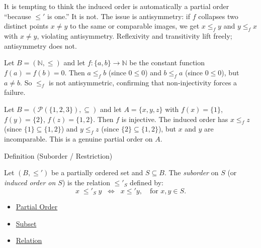 \begin{remark*}
It is tempting to think the induced order is automatically a partial order
``because $\leq'$ is one.'' It is not. The issue is antisymmetry: if $f$
collapses two distinct points $x \neq y$ to the same or comparable images,
we get $x \leq_f y$ and $y \leq_f x$ with $x \neq y$, violating
antisymmetry. Reflexivity and transitivity lift freely; antisymmetry does
not.
\end{remark*}

\begin{example*}
Let $B = (\mathbb{N}, \leq)$ and let $f : \{a,b\} \to \mathbb{N}$ be the
constant function $f(a) = f(b) = 0$. Then $a \leq_f b$ (since $0 \leq 0$)
and $b \leq_f a$ (since $0 \leq 0$), but $a \neq b$. So $\leq_f$ is not
antisymmetric, confirming that non-injectivity forces a failure.
\end{example*}

\begin{example*}
Let $B = (\mathcal{P}(\{1,2,3\}), \subseteq)$ and let
$A = \{x, y, z\}$ with $f(x) = \{1\}$, $f(y) = \{2\}$, $f(z) = \{1,2\}$.
Then $f$ is injective. The induced order has $x \leq_f z$ (since
$\{1\} \subseteq \{1,2\}$) and $y \leq_f z$ (since $\{2\} \subseteq \{1,2\}$),
but $x$ and $y$ are incomparable. This is a genuine partial order on $A$.
\end{example*}


\begin{definitionbox}{Definition (Suborder / Restriction)}
\begin{definition}\label{def:suborder}
Let $(B, \leq')$ be a partially ordered set and $S \subseteq B$. The
\emph{suborder} on $S$ (or \emph{induced order on $S$}) is the relation
$\leq'_S$ defined by:
\[
x \;\leq'_S\; y
\;\;\Longleftrightarrow\;\;
x \leq' y,
\quad \text{for } x, y \in S.
\]
\end{definition}
\end{definitionbox}

\begin{dependencies}
\begin{itemize}
  \item \hyperref[def:partial-order]{Partial Order}
  \item \hyperref[def:subset]{Subset}
  \item \hyperref[def:relation]{Relation}
\end{itemize}
\end{dependencies}

